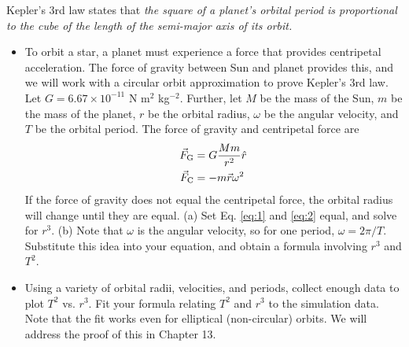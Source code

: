\documentclass[12pt]{article}
\begin{document}
Kepler's 3rd law states that \textit{the square of a planet's orbital period is proportional to the cube of the length of the semi-major axis of its orbit.}
\begin{itemize}
\item To orbit a star, a planet must experience a force that provides centripetal acceleration.  The force of gravity between Sun and planet provides this, and we will work with a circular orbit approximation to prove Kepler's 3rd law.  Let $G = 6.67\times 10^{-11}$ N m$^2$ kg$^{-2}$.  Further, let $M$ be the mass of the Sun, $m$ be the mass of the planet, $r$ be the orbital radius, $\omega$ be the angular velocity, and $T$ be the orbital period.  The force of gravity and centripetal force are
\begin{align}
\vec{F}_{\rm G} &= G\frac{Mm}{r^2}\hat{r} \label{eq:1} \\
\vec{F}_{\rm C} &= -m\vec{r}\omega^2 \label{eq:2} 
\end{align}
If the force of gravity does not equal the centripetal force, the orbital radius will change until they are equal.  (a) Set Eq. \ref{eq:1} and \ref{eq:2} equal, and solve for $r^3$. (b) Note that $\omega$ is the angular velocity, so for one period, $\omega = 2\pi/T$.  Substitute this idea into your equation, and obtain a formula involving $r^3$ and $T^2$.
\item Using a variety of orbital radii, velocities, and periods, collect enough data to plot $T^2$ vs. $r^3$.  Fit your formula relating $T^2$ and $r^3$ to the simulation data.  Note that the fit works even for elliptical (non-circular) orbits.  We will address the proof of this in Chapter 13.
\end{itemize}
\end{document}
